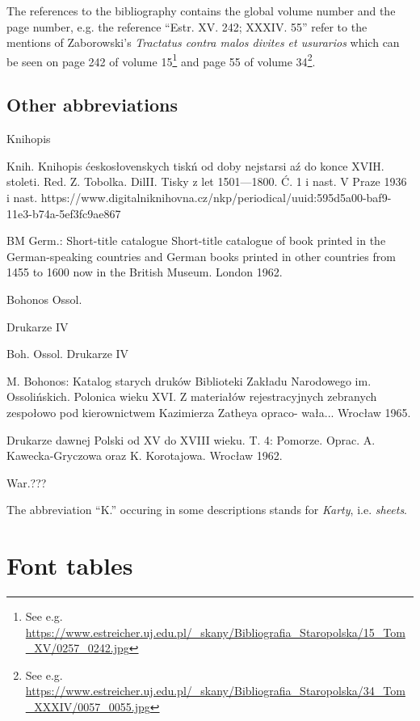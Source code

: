 \documentclass[12pt]{article}
\begin{document}
  The references to the bibliography contains the global volume number
  and the page number, e.g.  the reference ``Estr. XV. 242;
  XXXIV. 55'' refer to the mentions of Zaborowski's \textit{Tractatus
    contra malos divites et usurarios} which can be seen on page 242
  of volume 15\footnote{See e.g.
    \url{https://www.estreicher.uj.edu.pl/_skany/Bibliografia_Staropolska/15_Tom_XV/0257_0242.jpg}}
  and page 55 of volume 34\footnote{See e.g.
    \url{https://www.estreicher.uj.edu.pl/_skany/Bibliografia_Staropolska/34_Tom_XXXIV/0057_0055.jpg}}.

\subsection{Other abbreviations}
\label{sec:other-abbreviations}

Knihopis

Knih.
Knihopis ćeskosłovenskych tiskń od doby nejstarsi aź do konce XVIH.
stoleti. Red. Z. Tobolka. DilII. Tisky z let 1501—1800. Ć. 1 i nast. V Praze
1936 i nast.
https://www.digitalniknihovna.cz/nkp/periodical/uuid:595d5a00-baf9-11e3-b74a-5ef3fc9ae867

BM Germ.: Short-title catalogue
Short-title catalogue of book printed in the German-speaking countries
and German books printed in other countries from 1455 to 1600 now in
the British Museum. London 1962.

Bohonos Ossol.

Drukarze IV 

Boh. Ossol.
Drukarze IV

M. Bohonos: Katalog starych druków Biblioteki Zakładu Narodowego
im. Ossolińskich. Polonica wieku XVI. Z materiałów rejestracyjnych
zebranych zespołowo pod kierownictwem Kazimierza Zatheya opraco-
wała... Wrocław 1965.

Drukarze dawnej Polski od XV do XVIII wieku. T. 4: Pomorze. Oprac.
A. Kawecka-Gryczowa oraz K. Korotajowa. Wrocław 1962.

War.???

The abbreviation ``K.'' occuring in some descriptions stands for
\textit{Karty}, i.e. \textit{sheets}.

\newpage
\section{Font tables}
\label{sec:font-tables}

\end{document}
